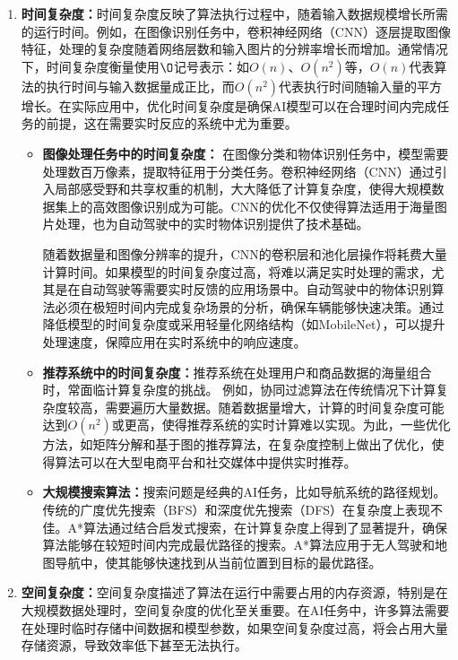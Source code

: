 \begin{enumerate}
\item {\bf 时间复杂度：}时间复杂度反映了算法执行过程中，随着输入数据规模增长所需的运行时间。例如，在图像识别任务中，卷积神经网络（CNN）逐层提取图像特征，处理的复杂度随着网络层数和输入图片的分辨率增长而增加。通常情况下，时间复杂度衡量使用$\O$记号表示：如$O(n)$、$O(n^2)$等，$O(n)$代表算法的执行时间与输入数据量成正比，而$O(n^2)$代表执行时间随输入量的平方增长。在实际应用中，优化时间复杂度是确保AI模型可以在合理时间内完成任务的前提，这在需要实时反应的系统中尤为重要。

\begin{itemize}
\item {\bf 图像处理任务中的时间复杂度：} 在图像分类和物体识别任务中，模型需要处理数百万像素，提取特征用于分类任务。卷积神经网络（CNN）通过引入局部感受野和共享权重的机制，大大降低了计算复杂度，使得大规模数据集上的高效图像识别成为可能。CNN的优化不仅使得算法适用于海量图片处理，也为自动驾驶中的实时物体识别提供了技术基础。

随着数据量和图像分辨率的提升，CNN的卷积层和池化层操作将耗费大量计算时间。如果模型的时间复杂度过高，将难以满足实时处理的需求，尤其是在自动驾驶等需要实时反馈的应用场景中。自动驾驶中的物体识别算法必须在极短时间内完成复杂场景的分析，确保车辆能够快速决策。通过降低模型的时间复杂度或采用轻量化网络结构（如MobileNet），可以提升处理速度，保障应用在实时系统中的响应速度。

\item {\bf 推荐系统中的时间复杂度：}推荐系统在处理用户和商品数据的海量组合时，常面临计算复杂度的挑战。
例如，协同过滤算法在传统情况下计算复杂度较高，需要遍历大量数据。随着数据量增大，计算的时间复杂度可能达到$O(n^2)$或更高，使得推荐系统的实时计算难以实现。为此，一些优化方法，如矩阵分解和基于图的推荐算法，在复杂度控制上做出了优化，使得算法可以在大型电商平台和社交媒体中提供实时推荐。

\item {\bf 大规模搜索算法：}搜索问题是经典的AI任务，比如导航系统的路径规划。传统的广度优先搜索（BFS）和深度优先搜索（DFS）在复杂度上表现不佳。A*算法通过结合启发式搜索，在计算复杂度上得到了显著提升，确保算法能够在较短时间内完成最优路径的搜索。A*算法应用于无人驾驶和地图导航中，使其能够快速找到从当前位置到目标的最优路径。
\end{itemize}

\item {\bf 空间复杂度：}空间复杂度描述了算法在运行中需要占用的内存资源，特别是在大规模数据处理时，空间复杂度的优化至关重要。在AI任务中，许多算法需要在处理时临时存储中间数据和模型参数，如果空间复杂度过高，将会占用大量存储资源，导致效率低下甚至无法执行。


\end{enumerate}
